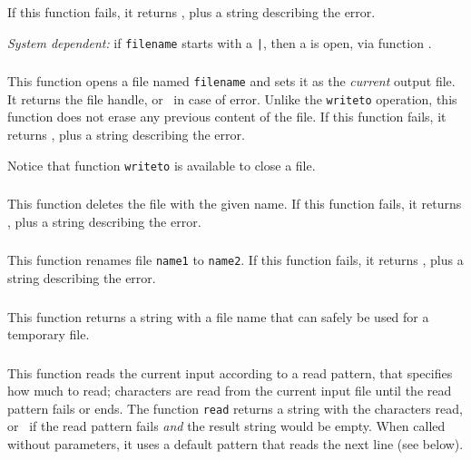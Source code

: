 If this function fails, it returns \nil,
plus a string describing the error.

{\em System dependent:} if \verb'filename' starts with a \verb'|',
then a  is open, via function .

\subsubsection*{}

This function opens a file named \verb'filename' and sets it as the
{\em current} output file.
It returns the file handle,
or \nil\ in case of error.
Unlike the \verb'writeto' operation,
this function does not erase any previous content of the file.
If this function fails, it returns \nil,
plus a string describing the error.

Notice that function \verb|writeto| is available to close a file.

\subsubsection*{}

This function deletes the file with the given name.
If this function fails, it returns \nil,
plus a string describing the error.

\subsubsection*{}

This function renames file \verb'name1' to \verb'name2'.
If this function fails, it returns \nil,
plus a string describing the error.

\subsubsection*{}

This function returns a string with a file name that can safely
be used for a temporary file.

\subsubsection*{}

This function reads the current input
according to a read pattern, that specifies how much to read;
characters are read from the current input file until
the read pattern fails or ends.
The function \verb|read| returns a string with the characters read,
or \nil\ if the read pattern fails {\em and\/}
the result string would be empty.
When called without parameters,
it uses a default pattern that reads the next line
(see below).

